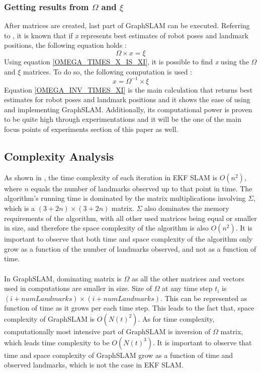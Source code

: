 \documentclass{ba-kecs}
\numberwithin{figure}{section}
\numberwithin{equation}{section}
\begin{document}
{\subsubsection{Getting results from $\Omega$ and $\xi$}
	After matrices are created, last part of GraphSLAM can be executed. Referring to \cite{sik2}, it is known that if \textit{x} represents best estimates of robot poses and landmark positions, the following equation holds :
	\begin{equation}
	\Omega \times x = \xi \label{OMEGA_TIMES_X_IS_XI}
	\end{equation}
	Using equation \eqref{OMEGA_TIMES_X_IS_XI}, it is possible to find \textit{x} using the $\Omega$ and $\xi$ matrices. To do so, the following computation is used :
	\begin{equation}
	x = \Omega^{-1} \times \xi \label{OMEGA_INV_TIMES_XI}
	\end{equation}
	Equation \eqref{OMEGA_INV_TIMES_XI} is the main calculation that returns best estimates for robot poses and landmark positions and it shows the ease of using and implementing GraphSLAM. Additionally, its computational power is proven to be quite high through experimentations\cite{sik,sik2} and it will be the one of the main focus points of experiments section of this paper as well.


\subsection{Complexity Analysis}
As shown in \cite{dennis}, the time complexity of each iteration in EKF SLAM is $O(n^2)$, where $n$ equals the number of landmarks observed up to that point in time. The algorithm's running time is dominated by the matrix multiplications involving $\Sigma$, which is a $(3 + 2n) \times (3 + 2n)$ matrix. $\Sigma$ also dominates the memory requirements of the algorithm, with all other used matrices being equal or smaller in size, and therefore the space complexity of the algorithm is also $O(n^2)$. It is important to observe that both time and space complexity of the algorithm only grow as a function of the number of landmarks observed, and not as a function of time.\\ \\
In GraphSLAM, dominating matrix is $\Omega$ as all the other matrices and vectors used in computations are smaller in size. Size of $\Omega$ at any time step $t_{i}$ is $(i+numLandmarks) \times (i+numLandmarks)$. This can be represented as function of time as it grows per each time step. This leads to the fact that, space complexity of GraphSLAM is $O(N(t)^2)$. As for time complexity, computationally most intensive part of GraphSLAM is inversion of $\Omega$ matrix, which leads time complexity to be $O(N(t)^3)$. It is important to observe that time and space complexity of GraphSLAM grow as a function of time and observed landmarks, which is not the case in EKF SLAM.

}
\end{document}
